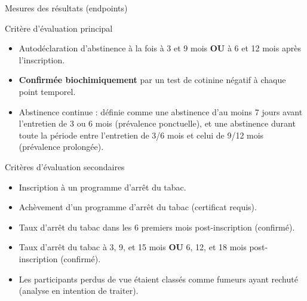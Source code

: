 \documentclass[aspectratio=169,xcolor=dvipsnames]{beamer}
\begin{document}
\begin{frame}{Mesures des résultats (endpoints)}
    \begin{block}{Critère d'évaluation principal}
        \begin{itemize}
            \item Autodéclaration d'abstinence à la fois à 3 et 9 mois \textbf{OU} à 6 et 12 mois après l'inscription.
            \item \textbf{Confirmée biochimiquement} par un test de cotinine négatif à chaque point temporel.
            \item Abstinence continue : définie comme une abstinence d'au moins 7 jours avant l'entretien de 3 ou 6 mois (prévalence ponctuelle), et une abstinence durant toute la période entre l'entretien de 3/6 mois et celui de 9/12 mois (prévalence prolongée).
        \end{itemize}
    \end{block}
    \pause
    \begin{alertblock}{Critères d'évaluation secondaires}
        \begin{itemize}
            \item Inscription à un programme d'arrêt du tabac.
            \item Achèvement d'un programme d'arrêt du tabac (certificat requis).
            \item Taux d'arrêt du tabac dans les 6 premiers mois post-inscription (confirmé).
            \item Taux d'arrêt du tabac à 3, 9, et 15 mois \textbf{OU} 6, 12, et 18 mois post-inscription (confirmé).
        \end{itemize}
    \end{alertblock}
    \begin{itemize}
        \item Les participants perdus de vue étaient classés comme fumeurs ayant rechuté (analyse en intention de traiter).
    \end{itemize}
\end{frame}
\end{document}
